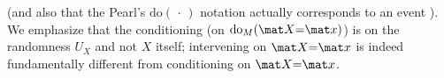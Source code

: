     (and also that the Pearl's $\mathrm{do}(\,\cdot\,)$ notation actually corresponds to an event \citep{sep-causal-models}). 
We emphasize that the conditioning (on $\mathrm{do}_M(\mat X{=}\mat x)$) is on the randomness $U_X$ and not $X$ itself; 
intervening on $\mat X{=}\mat x$ is indeed fundamentally different
from conditioning on $\mat X{=}\mat x$.
%
% 
